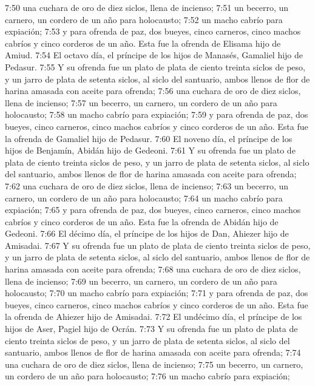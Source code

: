 7:50 una cuchara de oro de diez siclos,  llena de incienso;  
7:51 un becerro, un carnero, un cordero de un año para holocausto;  
7:52 un macho cabrío para expiación;  
7:53 y para ofrenda de paz, dos bueyes, cinco carneros, cinco machos cabríos y cinco corderos de un año. Esta fue la ofrenda de Elisama hijo de Amiud.  
7:54 El octavo día, el príncipe de los hijos de Manasés, Gamaliel hijo de Pedasur.  
7:55 Y su ofrenda fue un plato de plata de ciento treinta siclos   de peso, y un jarro de plata de setenta siclos, al siclo del santuario, ambos llenos de flor de harina amasada con aceite para ofrenda;  
7:56 una cuchara de oro de diez siclos,  llena de incienso;  
7:57 un becerro, un carnero, un cordero de un año para holocausto;  
7:58 un macho cabrío para expiación;  
7:59 y para ofrenda de paz, dos bueyes, cinco carneros, cinco machos cabríos y cinco corderos de un año. Esta fue la ofrenda de Gamaliel hijo de Pedasur.  
7:60 El noveno día, el príncipe de los hijos de Benjamín, Abidán hijo de Gedeoni.  
7:61 Y su ofrenda fue un plato de plata de ciento treinta siclos de peso,  y un jarro de plata de setenta siclos, al siclo del santuario, ambos llenos de flor de harina amasada con aceite para ofrenda;  
7:62 una cuchara de oro de diez siclos,  llena de incienso;  
7:63 un becerro, un carnero, un cordero de un año para holocausto;  
7:64 un macho cabrío para expiación;  
7:65 y para ofrenda de paz, dos bueyes, cinco carneros, cinco machos cabríos y cinco corderos de un año. Esta fue la ofrenda de Abidán hijo de Gedeoni.  
7:66 El décimo día, el príncipe de los hijos de Dan, Ahiezer hijo de Amisadai.  
7:67 Y su ofrenda fue un plato de plata de ciento treinta siclos de peso,  y un jarro de plata de setenta siclos, al siclo del santuario, ambos llenos de flor de harina amasada con aceite para ofrenda;  
7:68 una cuchara de oro de diez siclos,  llena de incienso;  
7:69 un becerro, un carnero, un cordero de un año para holocausto;  
7:70 un macho cabrío para expiación;  
7:71 y para ofrenda de paz, dos bueyes, cinco carneros, cinco machos cabríos y cinco corderos de un año. Esta fue la ofrenda de Ahiezer hijo de Amisadai.  
7:72 El undécimo día, el príncipe de los hijos de Aser, Pagiel hijo de Ocrán.  
7:73 Y su ofrenda fue un plato de plata de ciento treinta siclos de peso,  y un jarro de plata de setenta siclos, al siclo del santuario, ambos llenos de flor de harina amasada con aceite para ofrenda;  
7:74 una cuchara de oro de diez siclos,  llena de incienso;  
7:75 un becerro, un carnero, un cordero de un año para holocausto;  
7:76 un macho cabrío para expiación;  
